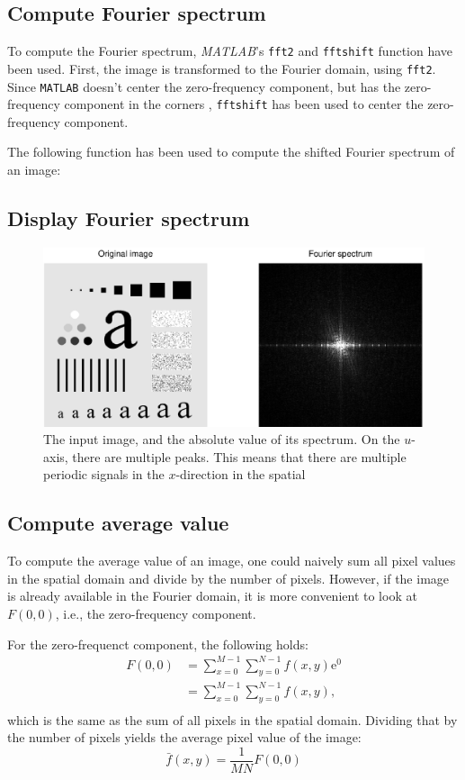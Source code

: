 \setcounter{subsection}{0}
\subsection{Compute Fourier spectrum}
To compute the Fourier spectrum, \textit{MATLAB}'s \texttt{fft2} and \texttt{fftshift} function have been used.
First, the image is transformed to the Fourier domain, using \texttt{fft2}.
Since \texttt{MATLAB} doesn't center the zero-frequency component, but has the zero-frequency component in the corners \cite{fftshift}, \texttt{fftshift} has been used to center the zero-frequency component.

The following function has been used to compute the shifted Fourier spectrum of an image:

\subsection{Display Fourier spectrum}
\begin{figure}[h]
 \centering
 \includegraphics{characters_spectrum.eps}
 \caption{The input image, and the absolute value of its spectrum. On the \(u\)-axis, there are multiple peaks. This means that there are multiple periodic signals in the \(x\)-direction in the spatial}
 \label{fig:characters_spectrum}
\end{figure}

\subsection{Compute average value}
To compute the average value of an image, one could naively sum all pixel values in the spatial domain and divide by the number of pixels.
However, if the image is already available in the Fourier domain, it is more convenient to look at \(F(0, 0)\), i.e., the zero-frequency component.

For the zero-frequenct component, the following holds:
\begin{equation} \label{zero_freq}
\begin{split}
F(0, 0) & = \sum_{x=0}^{M-1}\sum_{y=0}^{N-1}{f(x, y)\mathrm{e}^{0}} \\
 & = \sum_{x=0}^{M-1}\sum_{y=0}^{N-1}{f(x, y)}\text{,} \\
\end{split}
\end{equation}
which is the same as the sum of all pixels in the spatial domain.
Dividing that by the number of pixels yields the average pixel value of the image:
\[\bar{f}(x, y) = \frac{1}{MN}F(0, 0)\]
\clearpage